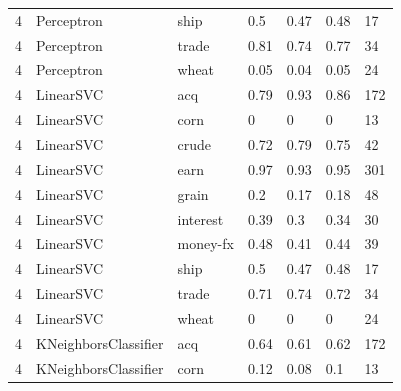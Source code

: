 \documentclass{article}
\begin{document}
\begin{table}[h]
\begin{tabular}{lllllll}
4             & Perceptron             & ship            & 0.5                & 0.47            & 0.48              & 17               \\
4             & Perceptron             & trade           & 0.81               & 0.74            & 0.77              & 34               \\
4             & Perceptron             & wheat           & 0.05               & 0.04            & 0.05              & 24               \\
4             & LinearSVC              & acq             & 0.79               & 0.93            & 0.86              & 172              \\
4             & LinearSVC              & corn            & 0                  & 0               & 0                 & 13               \\
4             & LinearSVC              & crude           & 0.72               & 0.79            & 0.75              & 42               \\
4             & LinearSVC              & earn            & 0.97               & 0.93            & 0.95              & 301              \\
4             & LinearSVC              & grain           & 0.2                & 0.17            & 0.18              & 48               \\
4             & LinearSVC              & interest        & 0.39               & 0.3             & 0.34              & 30               \\
4             & LinearSVC              & money-fx        & 0.48               & 0.41            & 0.44              & 39               \\
4             & LinearSVC              & ship            & 0.5                & 0.47            & 0.48              & 17               \\
4             & LinearSVC              & trade           & 0.71               & 0.74            & 0.72              & 34               \\
4             & LinearSVC              & wheat           & 0                  & 0               & 0                 & 24               \\
4             & KNeighborsClassifier   & acq             & 0.64               & 0.61            & 0.62              & 172              \\
4             & KNeighborsClassifier   & corn            & 0.12               & 0.08            & 0.1               & 13               \\

\end{tabular}
\end{table}
\end{document}
